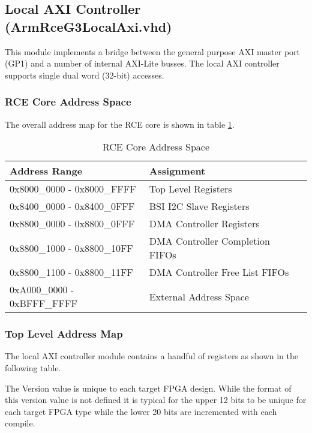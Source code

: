 \documentclass[11pt]{article}
\begin{document}
\subsection{Local AXI Controller (ArmRceG3LocalAxi.vhd)}
\label{subsec:ArmRceG3LocalAxi}

This module implements a bridge between the general purpose AXI master port (GP1) and a number of internal AXI-Lite busses.
The local AXI controller supports single dual word (32-bit) accesses.

\subsubsection{RCE Core Address Space}

The overall address map for the RCE core is shown in table \ref{tab:rce_core_map}. 

\begin{table}[H]
\small
\centering
   \begin{tabular}{| l | l | l | } 
      \hline \textbf{Address Range} & \textbf{Assignment} \\
      \hline 0x8000\_0000 - 0x8000\_FFFF & Top Level Registers \\
      \hline 0x8400\_0000 - 0x8400\_0FFF & BSI I2C Slave Registers \\
      \hline 0x8800\_0000 - 0x8800\_0FFF & DMA Controller Registers \\
      \hline 0x8800\_1000 - 0x8800\_10FF & DMA Controller Completion FIFOs \\
      \hline 0x8800\_1100 - 0x8800\_11FF & DMA Controller Free List FIFOs \\
      \hline 0xA000\_0000 - 0xBFFF\_FFFF & External Address Space \\
      \hline
   \end{tabular}
   \caption{RCE Core Address Space }
   \label{tab:rce_core_map}
\end{table}

\subsubsection{Top Level Address Map}

The local AXI controller module contains a handful of registers as shown in the following table. 

The Version value is unique to each target FPGA design. While the format of this version value is not defined it is typical for the upper 
12 bits to be unique for each target FPGA type while the lower 20 bits are incremented with each compile.
\end{document}
